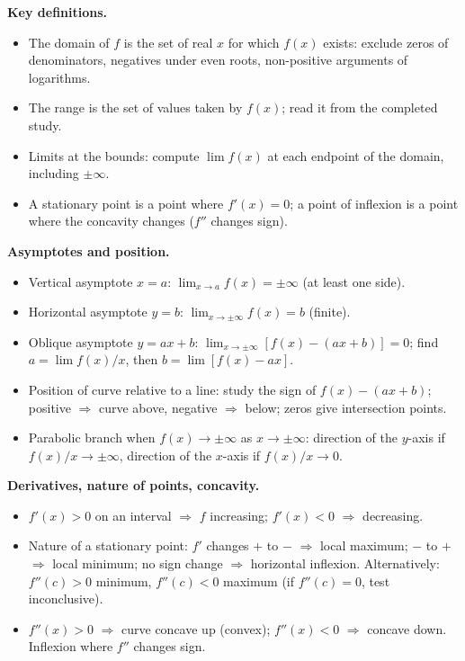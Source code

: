 \documentclass[11pt]{article}
\newcommand{\cle}[1]{{\popxbold\color{popdark}#1}}
\begin{document}
\begin{bilan}
\textbf{Key definitions.}
\begin{itemize}
\item The \cle{domain} of $f$ is the set of real $x$ for which $f(x)$ exists: exclude zeros of denominators, negatives under even roots, non-positive arguments of logarithms.
\item The \cle{range} is the set of values taken by $f(x)$; read it from the completed study.
\item \cle{Limits at the bounds}: compute $\lim f(x)$ at each endpoint of the domain, including $\pm\infty$.
\item A \cle{stationary point} is a point where $f'(x)=0$; a \cle{point of inflexion} is a point where the concavity changes ($f''$ changes sign).
\end{itemize}

\textbf{Asymptotes and position.}
\begin{itemize}
\item \cle{Vertical asymptote} $x=a$: $\lim_{x\to a}f(x)=\pm\infty$ (at least one side).
\item \cle{Horizontal asymptote} $y=b$: $\lim_{x\to\pm\infty}f(x)=b$ (finite).
\item \cle{Oblique asymptote} $y=ax+b$: $\lim_{x\to\pm\infty}[f(x)-(ax+b)]=0$; find $a=\lim f(x)/x$, then $b=\lim[f(x)-ax]$.
\item \cle{Position of curve relative to a line}: study the sign of $f(x)-(ax+b)$; positive $\Rightarrow$ curve above, negative $\Rightarrow$ below; zeros give intersection points.
\item \cle{Parabolic branch} when $f(x)\to\pm\infty$ as $x\to\pm\infty$: direction of the $y$-axis if $f(x)/x\to\pm\infty$, direction of the $x$-axis if $f(x)/x\to 0$.
\end{itemize}

\textbf{Derivatives, nature of points, concavity.}
\begin{itemize}
\item $f'(x)>0$ on an interval $\Rightarrow$ $f$ \cle{increasing}; $f'(x)<0$ $\Rightarrow$ \cle{decreasing}.
\item Nature of a stationary point: $f'$ changes $+$ to $-$ $\Rightarrow$ \cle{local maximum}; $-$ to $+$ $\Rightarrow$ \cle{local minimum}; no sign change $\Rightarrow$ horizontal inflexion. Alternatively: $f''(c)>0$ minimum, $f''(c)<0$ maximum (if $f''(c)=0$, test inconclusive).
\item $f''(x)>0$ $\Rightarrow$ curve \cle{concave up} (convex); $f''(x)<0$ $\Rightarrow$ \cle{concave down}. Inflexion where $f''$ changes sign.
\end{itemize}


\end{bilan}
\end{document}
